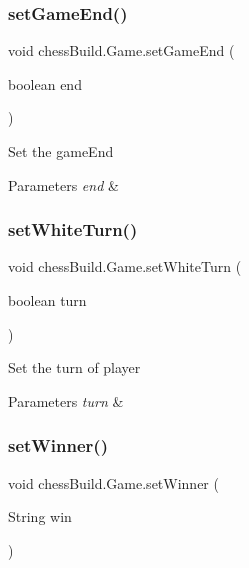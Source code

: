 \subsubsection{\texorpdfstring{set\+Game\+End()}{setGameEnd()}}
{\footnotesize\ttfamily void chess\+Build.\+Game.\+set\+Game\+End (\begin{DoxyParamCaption}\item[{boolean}]{end }\end{DoxyParamCaption})}

Set the game\+End 
\begin{DoxyParams}{Parameters}
{\em end} & \\
\hline
\end{DoxyParams}
\mbox{\label{classchess_build_1_1_game_a32d1a61488dc1af6c1d33c3ff2f40bd1}} 
\subsubsection{\texorpdfstring{set\+White\+Turn()}{setWhiteTurn()}}
{\footnotesize\ttfamily void chess\+Build.\+Game.\+set\+White\+Turn (\begin{DoxyParamCaption}\item[{boolean}]{turn }\end{DoxyParamCaption})}

Set the turn of player 
\begin{DoxyParams}{Parameters}
{\em turn} & \\
\hline
\end{DoxyParams}
\mbox{\label{classchess_build_1_1_game_a6bc01e50f0e37b437db78cb029807d25}} 
\subsubsection{\texorpdfstring{set\+Winner()}{setWinner()}}
{\footnotesize\ttfamily void chess\+Build.\+Game.\+set\+Winner (\begin{DoxyParamCaption}\item[{String}]{win }\end{DoxyParamCaption})}

